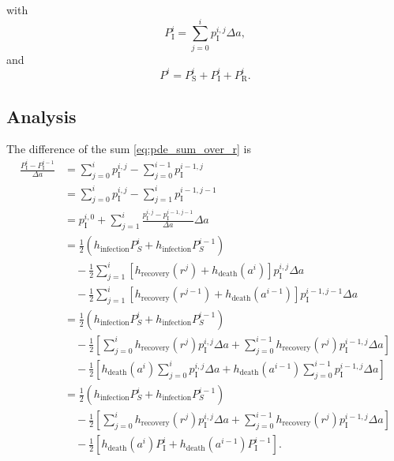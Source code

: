 \documentclass[12pt]{article}
\begin{document}
with
\begin{equation}
  \label{eq:pde_sum_over_r}
  P_{\mathrm{I}}^i
  = \sum_{j = 0}^i p_{\mathrm{I}}^{i, j} \Delta a,
\end{equation}
and
\begin{equation}
  P^i =  P_{\mathrm{S}}^i + P_{\mathrm{I}}^i + P_{\mathrm{R}}^i.
\end{equation}


\subsection{Analysis}

The difference of the sum \eqref{eq:pde_sum_over_r} is
\begin{equation}
  \label{eq:pde_sum_difference}
  \begin{split}
    \frac{P_{\mathrm{I}}^i - P_{\mathrm{I}}^{i - 1}}{\Delta a}
    &=
    \sum_{j = 0}^i p_{\mathrm{I}}^{i, j}
    - \sum_{j = 0}^{i - 1} p_{\mathrm{I}}^{i - 1, j}
    \\
    &=
    \sum_{j = 0}^i p_{\mathrm{I}}^{i, j}
    - \sum_{j = 1}^i p_{\mathrm{I}}^{i - 1, j - 1}
    \\
    &= p_{\mathrm{I}}^{i, 0}
    + \sum_{j = 1}^i
    \frac{p_{\mathrm{I}}^{i, j} - p_{\mathrm{I}}^{i - 1, j - 1}}
    {\Delta a} \Delta a
    \\
    &= \frac{1}{2} \left(h_{\text{infection}} P_S^i
      + h_{\text{infection}} P_S^{i - 1}\right)
    \\ & \quad {}
    - \frac{1}{2} \sum_{j = 1}^i
    \left[h_{\text{recovery}}(r^j) + h_{\text{death}}(a^i)\right]
    p_{\mathrm{I}}^{i, j} \Delta a
    \\ & \quad {}
    - \frac{1}{2} \sum_{j = 1}^i
    \left[h_{\text{recovery}}(r^{j - 1}) + h_{\text{death}}(a^{i - 1})\right]
    p_{\mathrm{I}}^{i - 1, j - 1} \Delta a
    \\
    &= \frac{1}{2} \left(h_{\text{infection}} P_S^i
      + h_{\text{infection}} P_S^{i - 1}\right)
    \\ & \quad {}
    - \frac{1}{2} \left[
      \sum_{j = 0}^i h_{\text{recovery}}(r^j)
      p_{\mathrm{I}}^{i, j} \Delta a
      + \sum_{j = 0}^{i - 1} h_{\text{recovery}}(r^j)
      p_{\mathrm{I}}^{i - 1, j} \Delta a
    \right]
    \\ & \quad {}
    - \frac{1}{2} \left[
      h_{\text{death}}(a^i)
      \sum_{j = 0}^i p_{\mathrm{I}}^{i, j} \Delta a
      + h_{\text{death}}(a^{i - 1})
      \sum_{j = 0}^{i - 1} p_{\mathrm{I}}^{i - 1, j} \Delta a
    \right]
    \\
    &= \frac{1}{2} \left(h_{\text{infection}} P_S^i
      + h_{\text{infection}} P_S^{i - 1}\right)
    \\ & \quad {}
    - \frac{1}{2} \left[
      \sum_{j = 0}^i h_{\text{recovery}}(r^j)
      p_{\mathrm{I}}^{i, j} \Delta a
      + \sum_{j = 0}^{i - 1} h_{\text{recovery}}(r^j)
      p_{\mathrm{I}}^{i - 1, j} \Delta a
    \right]
    \\ & \quad {}
    - \frac{1}{2} \left[
      h_{\text{death}}(a^i) P_{\mathrm{I}}^i
      + h_{\text{death}}(a^{i - 1}) P_{\mathrm{I}}^{i - 1}
    \right].
  \end{split}
\end{equation}
\end{document}
